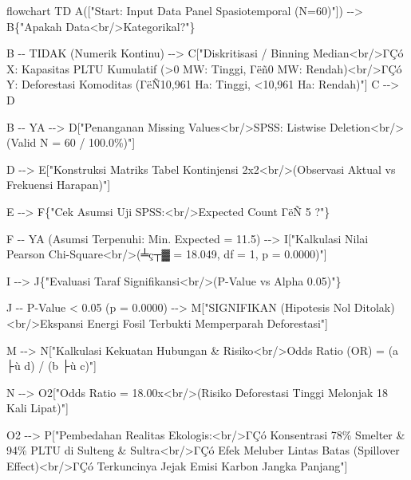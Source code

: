 \documentclass[
]{article}
\newenvironment{Shaded}{}{}
\newcommand{\NormalTok}[1]{#1}
\begin{document}
\begin{Shaded}
\begin{Highlighting}[]
\NormalTok{flowchart TD}
\NormalTok{    A(["Start: Input Data Panel Spasiotemporal (N=60)"]) {-}{-}\textgreater{} B\{"Apakah Data\textless{}br/\textgreater{}Kategorikal?"\}}
    
\NormalTok{    B {-}{-} TIDAK (Numerik Kontinu) {-}{-}\textgreater{} C["Diskritisasi / Binning Median\textless{}br/\textgreater{}ΓÇó X: Kapasitas PLTU Kumulatif (\textgreater{}0 MW: Tinggi, Γëñ0 MW: Rendah)\textless{}br/\textgreater{}ΓÇó Y: Deforestasi Komoditas (ΓëÑ10,961 Ha: Tinggi, \textless{}10,961 Ha: Rendah)"]}
\NormalTok{    C {-}{-}\textgreater{} D}
    
\NormalTok{    B {-}{-} YA {-}{-}\textgreater{} D["Penanganan Missing Values\textless{}br/\textgreater{}SPSS: Listwise Deletion\textless{}br/\textgreater{}(Valid N = 60 / 100.0\%)"]}
    
\NormalTok{    D {-}{-}\textgreater{} E["Konstruksi Matriks Tabel Kontinjensi 2x2\textless{}br/\textgreater{}(Observasi Aktual vs Frekuensi Harapan)"]}
    
\NormalTok{    E {-}{-}\textgreater{} F\{"Cek Asumsi Uji SPSS:\textless{}br/\textgreater{}Expected Count ΓëÑ 5 ?"\}}
    
\NormalTok{    F {-}{-} YA (Asumsi Terpenuhi: Min. Expected = 11.5) {-}{-}\textgreater{} I["Kalkulasi Nilai Pearson Chi{-}Square\textless{}br/\textgreater{}(╧ç┬▓ = 18.049, df = 1, p = 0.0000)"]}
    
\NormalTok{    I {-}{-}\textgreater{} J\{"Evaluasi Taraf Signifikansi\textless{}br/\textgreater{}(P{-}Value vs Alpha 0.05)"\}}
    
\NormalTok{    J {-}{-} P{-}Value \textless{} 0.05 (p = 0.0000) {-}{-}\textgreater{} M["SIGNIFIKAN (Hipotesis Nol Ditolak)\textless{}br/\textgreater{}Ekspansi Energi Fosil Terbukti Memperparah Deforestasi"]}
    
\NormalTok{    M {-}{-}\textgreater{} N["Kalkulasi Kekuatan Hubungan \& Risiko\textless{}br/\textgreater{}Odds Ratio (OR) = (a ├ù d) / (b ├ù c)"]}
    
\NormalTok{    N {-}{-}\textgreater{} O2["Odds Ratio = 18.00x\textless{}br/\textgreater{}(Risiko Deforestasi Tinggi Melonjak 18 Kali Lipat)"]}
    
\NormalTok{    O2 {-}{-}\textgreater{} P["Pembedahan Realitas Ekologis:\textless{}br/\textgreater{}ΓÇó Konsentrasi 78\% Smelter \& 94\% PLTU di Sulteng \& Sultra\textless{}br/\textgreater{}ΓÇó Efek Meluber Lintas Batas (Spillover Effect)\textless{}br/\textgreater{}ΓÇó Terkuncinya Jejak Emisi Karbon Jangka Panjang"]}
    

\end{Highlighting}
\end{Shaded}
\end{document}
